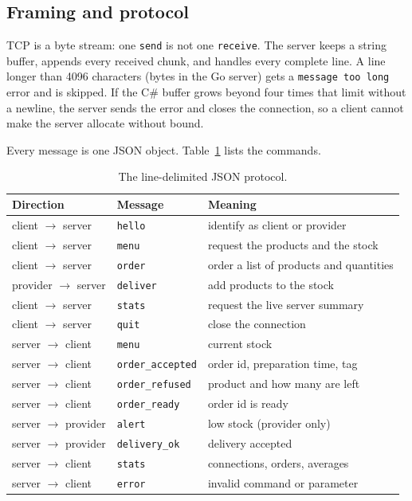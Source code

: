 \documentclass[12pt,a4paper]{article}
\begin{document}
\subsection{Framing and protocol}

TCP is a byte stream: one \texttt{send} is not one \texttt{receive}. The server
keeps a string buffer, appends every received chunk, and handles every complete
line. A line longer than 4096 characters (bytes in the Go server) gets a
\texttt{message too long} error and is skipped. If the C\# buffer grows beyond
four times that limit without a newline, the server sends the error and closes
the connection, so a client cannot make the server allocate without bound.

Every message is one JSON object. Table~\ref{tab:protocol} lists the commands.

\begin{table}[h]
\centering
\small
\begin{tabularx}{\textwidth}{@{}l l X@{}}
\toprule
Direction & Message & Meaning \\
\midrule
client $\rightarrow$ server & \texttt{hello} & identify as client or provider \\
client $\rightarrow$ server & \texttt{menu} & request the products and the stock \\
client $\rightarrow$ server & \texttt{order} & order a list of products and quantities \\
provider $\rightarrow$ server & \texttt{deliver} & add products to the stock \\
client $\rightarrow$ server & \texttt{stats} & request the live server summary \\
client $\rightarrow$ server & \texttt{quit} & close the connection \\
\midrule
server $\rightarrow$ client & \texttt{menu} & current stock \\
server $\rightarrow$ client & \texttt{order\_accepted} & order id, preparation time, tag \\
server $\rightarrow$ client & \texttt{order\_refused} & product and how many are left \\
server $\rightarrow$ client & \texttt{order\_ready} & order id is ready \\
server $\rightarrow$ provider & \texttt{alert} & low stock (provider only) \\
server $\rightarrow$ provider & \texttt{delivery\_ok} & delivery accepted \\
server $\rightarrow$ client & \texttt{stats} & connections, orders, averages \\
server $\rightarrow$ client & \texttt{error} & invalid command or parameter \\
\bottomrule
\end{tabularx}
\caption{The line-delimited JSON protocol.}
\label{tab:protocol}
\end{table}
\end{document}
